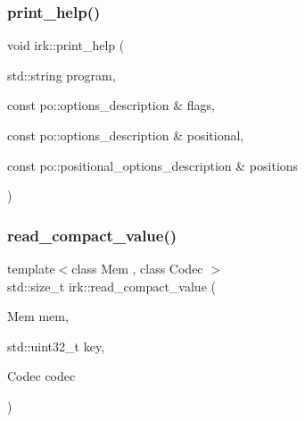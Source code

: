 \mbox{\label{namespaceirk_a955c6546f4b05a706dcc5608ce7bbad3}} 
\subsubsection{\texorpdfstring{print\+\_\+help()}{print\_help()}}
{\footnotesize\ttfamily void irk\+::print\+\_\+help (\begin{DoxyParamCaption}\item[{std\+::string}]{program,  }\item[{const po\+::options\+\_\+description \&}]{flags,  }\item[{const po\+::options\+\_\+description \&}]{positional,  }\item[{const po\+::positional\+\_\+options\+\_\+description \&}]{positions }\end{DoxyParamCaption})}

\mbox{\label{namespaceirk_a5a2bb996aa2fce0aa00ae9aafd500bba}} 
\subsubsection{\texorpdfstring{read\+\_\+compact\+\_\+value()}{read\_compact\_value()}}
{\footnotesize\ttfamily template$<$class Mem , class Codec $>$ \\
std\+::size\+\_\+t irk\+::read\+\_\+compact\+\_\+value (\begin{DoxyParamCaption}\item[{Mem}]{mem,  }\item[{std\+::uint32\+\_\+t}]{key,  }\item[{Codec}]{codec }\end{DoxyParamCaption})}

\mbox{\label{namespaceirk_a9bbfe619867ce962c69054e3417b4b11}} 
